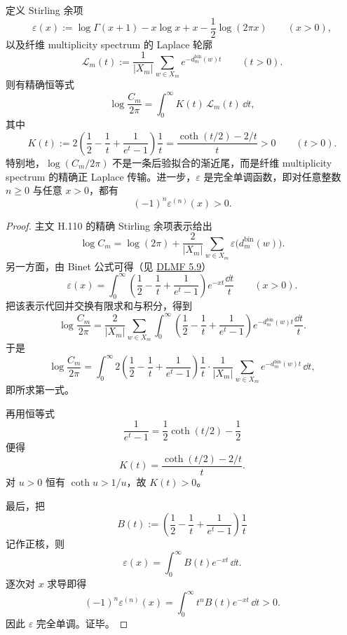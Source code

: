 \begin{theorem}\label{thm:xi-time-part9zbd-foldgauge-binet-laplace-transport}
定义 Stirling 余项
\[
\varepsilon(x):=
\log\Gamma(x+1)-x\log x+x-\frac12\log(2\pi x)
\qquad (x>0),
\]
以及纤维 multiplicity spectrum 的 Laplace 轮廓
\[
\mathcal L_m(t):=
\frac1{|X_m|}\sum_{w\in X_m}e^{-d_m^{\mathrm{bin}}(w)t}
\qquad (t>0).
\]
则有精确恒等式
\[
\log\frac{C_m}{2\pi}
=
\int_0^\infty K(t)\,\mathcal L_m(t)\,\dd t,
\]
其中
\[
K(t):=
2\left(\frac12-\frac1t+\frac1{e^t-1}\right)\frac1t
=
\frac{\coth(t/2)-2/t}{t}
>0
\qquad (t>0).
\]
特别地，\(\log(C_m/2\pi)\) 不是一条后验拟合的渐近尾，而是纤维 multiplicity spectrum 的精确正 Laplace 传输。进一步，\(\varepsilon\) 是完全单调函数，即对任意整数 \(n\ge 0\) 与任意 \(x>0\)，都有
\[
(-1)^n\varepsilon^{(n)}(x)>0.
\]
\end{theorem}
\begin{proof}
主文 H.110 的精确 Stirling 余项表示给出
\[
\log C_m
=
\log(2\pi)
+
\frac{2}{|X_m|}\sum_{w\in X_m}\varepsilon\bigl(d_m^{\mathrm{bin}}(w)\bigr).
\]
另一方面，由 Binet 公式可得（见 \href{https://dlmf.nist.gov/5.9}{DLMF 5.9}）
\[
\varepsilon(x)
=
\int_0^\infty
\left(\frac12-\frac1t+\frac1{e^t-1}\right)e^{-xt}\frac{\dd t}{t}
\qquad (x>0).
\]
把该表示代回并交换有限求和与积分，得到
\[
\log\frac{C_m}{2\pi}
=
\frac{2}{|X_m|}
\sum_{w\in X_m}
\int_0^\infty
\left(\frac12-\frac1t+\frac1{e^t-1}\right)e^{-d_m^{\mathrm{bin}}(w)t}\frac{\dd t}{t}.
\]
于是
\[
\log\frac{C_m}{2\pi}
=
\int_0^\infty
2\left(\frac12-\frac1t+\frac1{e^t-1}\right)\frac1t
\cdot
\frac1{|X_m|}\sum_{w\in X_m}e^{-d_m^{\mathrm{bin}}(w)t}\,\dd t,
\]
即所求第一式。

再用恒等式
\[
\frac1{e^t-1}=\frac12\coth(t/2)-\frac12
\]
便得
\[
K(t)=\frac{\coth(t/2)-2/t}{t}.
\]
对 \(u>0\) 恒有 \(\coth u>1/u\)，故 \(K(t)>0\)。

最后，把
\[
B(t):=
\left(\frac12-\frac1t+\frac1{e^t-1}\right)\frac1t
\]
记作正核，则
\[
\varepsilon(x)=\int_0^\infty B(t)e^{-xt}\,\dd t.
\]
逐次对 \(x\) 求导即得
\[
(-1)^n\varepsilon^{(n)}(x)
=
\int_0^\infty t^n B(t)e^{-xt}\,\dd t
>0.
\]
因此 \(\varepsilon\) 完全单调。证毕。
\end{proof}

